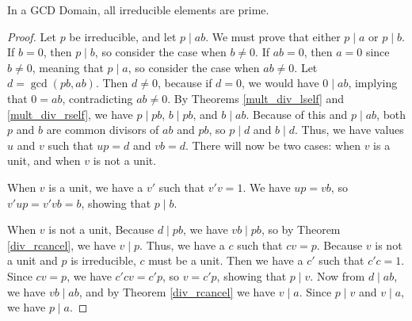\documentclass[../../math.tex]{subfiles}
\begin{document}
\begin{theorem} \label{irreducible_prime}
    In a GCD Domain, all irreducible elements are prime.
\end{theorem}
\begin{proof}
    Let $p$ be irreducible, and let $p \mid ab$.  We must prove that either $p
    \mid a$ or $p \mid b$.  If $b = 0$, then $p \mid b$, so consider the case
    when $b \neq 0$.  If $ab = 0$, then $a = 0$ since $b \neq 0$, meaning that
    $p \mid a$, so consider the case when $ab \neq 0$.  Let $d = \gcd(pb, ab)$.
    Then $d \neq 0$, because if $d = 0$, we would have $0 \mid ab$, implying
    that $0 = ab$, contradicting $ab \neq 0$.  By Theorems \ref{mult_div_lself}
    and \ref{mult_div_rself}, we have $p \mid pb$, $b \mid pb$, and $b \mid ab$.
    Because of this and $p \mid ab$, both $p$ and $b$ are common divisors of
    $ab$ and $pb$, so $p \mid d$ and $b \mid d$.  Thus, we have values $u$ and
    $v$ such that $up = d$ and $vb = d$.  There will now be two cases: when $v$
    is a unit, and when $v$ is not a unit.

    When $v$ is a unit, we have a $v'$ such that $v'v = 1$.  We have $up = vb$,
    so $v'up = v'vb = b$, showing that $p \mid b$.

    When $v$ is not a unit, Because $d \mid pb$, we have $vb \mid pb$, so by
    Theorem \ref{div_rcancel}, we have $v \mid p$.  Thus, we have a $c$ such
    that $cv = p$.  Because $v$ is not a unit and $p$ is irreducible, $c$ must
    be a unit.  Then we have a $c'$ such that $c'c = 1$.  Since $cv = p$, we
    have $c'cv = c'p$, so $v = c'p$, showing that $p \mid v$.  Now from $d \mid
    ab$, we have $vb \mid ab$, and by Theorem \ref{div_rcancel} we have $v \mid
    a$.  Since $p \mid v$ and $v \mid a$, we have $p \mid a$.
\end{proof}
\end{document}
